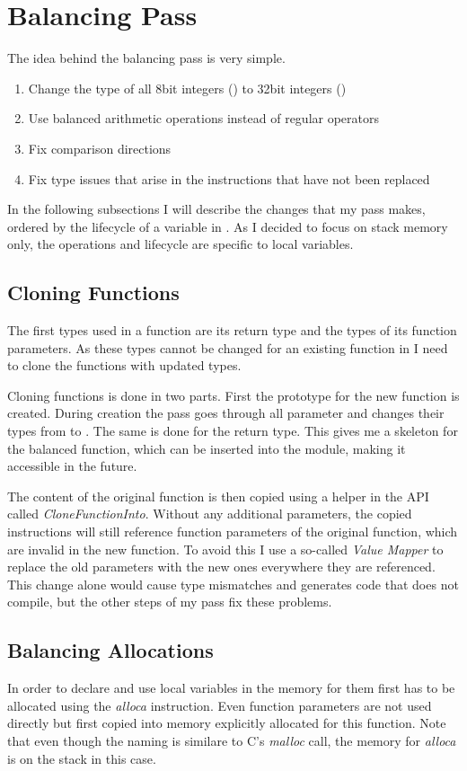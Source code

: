\section{Balancing Pass}
\label{pass}
The idea behind the balancing pass is very simple.
\begin{enumerate}
\item Change the type of all 8bit integers () to 32bit integers ()
\item Use balanced arithmetic operations instead of regular operators
\item Fix comparison directions
\item Fix type issues that arise in the instructions that have not been replaced
\end{enumerate}

In the following subsections I will describe the changes that my pass makes, ordered by the lifecycle of a variable in \ir{}.
As I decided to focus on stack memory only, the operations and lifecycle are specific to local variables.

\subsection{Cloning Functions}
The first types used in a function are its return type and the types of its function parameters.
As these types cannot be changed for an existing function in \llvm{} I need to clone the functions with updated types.

Cloning functions is done in two parts.
First the prototype for the new function is created.
During creation the pass goes through all parameter and changes their types from  to .
The same is done for the return type.
This gives me a skeleton for the balanced function, which can be inserted into the module, making it accessible in the future.

The content of the original function is then copied using a helper in the \llvm{} API called \emph{CloneFunctionInto}.
Without any additional parameters, the copied instructions will still reference function parameters of the original function, which are invalid in the new function.
To avoid this I use a so-called \emph{Value Mapper} to replace the old parameters with the new ones everywhere they are referenced.
This change alone would cause type mismatches and generates code that does not compile, but the other steps of my pass fix these problems.

\subsection{Balancing Allocations}
In order to declare and use local variables in \ir{} the memory for them first has to be allocated using the \emph{alloca} instruction.
Even function parameters are not used directly but first copied into memory explicitly allocated for this function.
Note that even though the naming is similare to C's \emph{malloc} call, the memory for \emph{alloca} is on the stack in this case.

